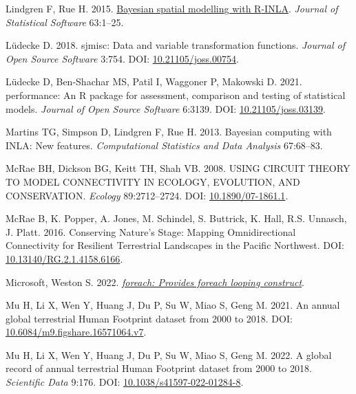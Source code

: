 \documentclass[10pt,a4paper]{article}
\newlength{\cslhangindent}
\newenvironment{CSLReferences}[2] %
 {\begin{list}{}{%
  \setlength{\itemindent}{0pt}
  \setlength{\leftmargin}{0pt}
  \setlength{\parsep}{0pt}
  \ifodd #1
   \setlength{\leftmargin}{\cslhangindent}
   \setlength{\itemindent}{-1\cslhangindent}
  \fi
  \setlength{\itemsep}{#2\baselineskip}}}
 {\end{list}}
\begin{document}
\begin{CSLReferences}{1}{0}
Lindgren F, Rue H. 2015. \href{http://www.jstatsoft.org/v63/i19/}{Bayesian spatial modelling with {R}-{INLA}}. \emph{Journal of Statistical Software} 63:1--25.

Lüdecke D. 2018. {sjmisc}: Data and variable transformation functions. \emph{Journal of Open Source Software} 3:754. DOI: \href{https://doi.org/10.21105/joss.00754}{10.21105/joss.00754}.

Lüdecke D, Ben-Shachar MS, Patil I, Waggoner P, Makowski D. 2021. {performance}: An {R} package for assessment, comparison and testing of statistical models. \emph{Journal of Open Source Software} 6:3139. DOI: \href{https://doi.org/10.21105/joss.03139}{10.21105/joss.03139}.

Martins TG, Simpson D, Lindgren F, Rue H. 2013. Bayesian computing with {INLA}: {N}ew features. \emph{Computational Statistics and Data Analysis} 67:68--83.

McRae BH, Dickson BG, Keitt TH, Shah VB. 2008. {USING} {CIRCUIT} {THEORY} {TO} {MODEL} {CONNECTIVITY} {IN} {ECOLOGY}, {EVOLUTION}, {AND} {CONSERVATION}. \emph{Ecology} 89:2712--2724. DOI: \href{https://doi.org/10.1890/07-1861.1}{10.1890/07-1861.1}.

McRae B, K. Popper, A. Jones, M. Schindel, S. Buttrick, K. Hall, R.S. Unnasch, J. Platt. 2016. Conserving {Nature}'s {Stage}: {Mapping} {Omnidirectional} {Connectivity} for {Resilient} {Terrestrial} {Landscapes} in the {Pacific} {Northwest}. DOI: \href{https://doi.org/10.13140/RG.2.1.4158.6166}{10.13140/RG.2.1.4158.6166}.

Microsoft, Weston S. 2022. \emph{\href{https://CRAN.R-project.org/package=foreach}{{foreach}: Provides foreach looping construct}}.

Mu H, Li X, Wen Y, Huang J, Du P, Su W, Miao S, Geng M. 2021. An annual global terrestrial {Human} {Footprint} dataset from 2000 to 2018. DOI: \href{https://doi.org/10.6084/m9.figshare.16571064.v7}{10.6084/m9.figshare.16571064.v7}.

Mu H, Li X, Wen Y, Huang J, Du P, Su W, Miao S, Geng M. 2022. A global record of annual terrestrial {Human} {Footprint} dataset from 2000 to 2018. \emph{Scientific Data} 9:176. DOI: \href{https://doi.org/10.1038/s41597-022-01284-8}{10.1038/s41597-022-01284-8}.


\end{CSLReferences}
\end{document}
